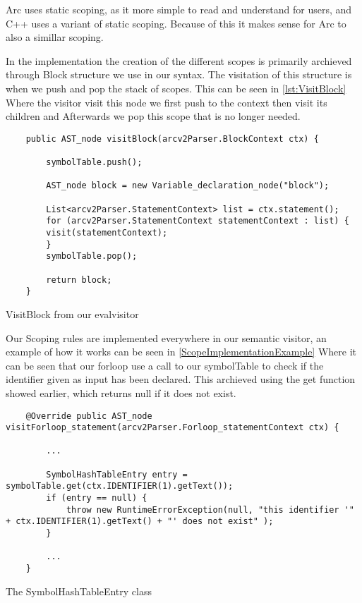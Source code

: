 Arc uses static scoping, as it more simple to read and understand for users, and C++ uses a variant of static scoping. Because of this it makes sense for Arc to also a simillar scoping.

In the implementation the creation of the different scopes is primarily archieved through Block structure we use in our syntax. The visitation of this structure is when we push and pop the stack of scopes. This can be seen in \ref{lst:VisitBlock} Where the visitor visit this node we first push to the context then visit its children and Afterwards we pop this scope that is no longer needed. 

\begin{listing}[htb!]
    \begin{verbatim}
    public AST_node visitBlock(arcv2Parser.BlockContext ctx) {

        symbolTable.push();

        AST_node block = new Variable_declaration_node("block");

        List<arcv2Parser.StatementContext> list = ctx.statement();
        for (arcv2Parser.StatementContext statementContext : list) {
        visit(statementContext);   
        }
        symbolTable.pop();

        return block;
    }
\end{verbatim}
\caption{VisitBlock from our evalvisitor}
\label{lst:VisitBlock}
\end{listing}

Our Scoping rules are implemented everywhere in our semantic visitor, an example of how it works can be seen in \ref{ScopeImplementationExample} Where it can be seen that our forloop use a call to our symbolTable to check if the identifier given as input has been declared. This archieved using the get function showed earlier, which returns null if it does not exist.

\begin{listing}[htb!]
    \begin{verbatim}
    @Override public AST_node visitForloop_statement(arcv2Parser.Forloop_statementContext ctx) { 
        
        ...

        SymbolHashTableEntry entry = symbolTable.get(ctx.IDENTIFIER(1).getText());
        if (entry == null) {
            throw new RuntimeErrorException(null, "this identifier '" + ctx.IDENTIFIER(1).getText() + "' does not exist" );
        }

        ...
    }
\end{verbatim}
\caption{The SymbolHashTableEntry class}
\label{lst:ScopeImplementationExample}
\end{listing}



